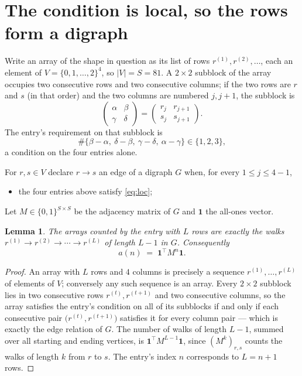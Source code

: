 \documentclass[11pt,a4paper]{article}
\theoremstyle{plain}
\newtheorem{lemma}[theorem]{Lemma}
\theoremstyle{definition}
\begin{document}
\section{The condition is local, so the rows form a digraph}

Write an array of the shape in question as its list of rows
$r^{(1)},r^{(2)},\dots$, each an element of
$V=\{0,1,\dots,2\}^{4}$, so $|V|=S=81$. A $2\times2$ subblock of the array
occupies two consecutive rows and two consecutive columns; if the two rows are $r$
and $s$ (in that order) and the two columns are numbered $j,j+1$,
the subblock is
\[
\begin{pmatrix}\alpha&\beta\\\gamma&\delta\end{pmatrix}=\begin{pmatrix}r_j&r_{j+1}\\s_j&s_{j+1}\end{pmatrix}.
\]
The entry's requirement on that subblock is
\begin{equation}\label{eq:loc}
\#\{\beta-\alpha,\ \delta-\beta,\ \gamma-\delta,\ \alpha-\gamma\}\in\{1,2,3\},
\end{equation}
a condition on the four entries alone.

For $r,s\in V$ declare $r\to s$ an edge of a digraph $G$ when, for every
$1\le j\le 4-1$,
\begin{itemize}
\item the four entries above satisfy \eqref{eq:loc};

\end{itemize}
Let $M\in\{0,1\}^{S\times S}$ be the adjacency matrix of $G$ and $\mathbf{1}$ the
all-ones vector.

\begin{lemma}\label{lem:walk}
The arrays counted by the entry with $L$ rows are exactly the walks
$r^{(1)}\to r^{(2)}\to\cdots\to r^{(L)}$ of length $L-1$ in $G$. Consequently
\[
a(n)\;=\;\mathbf{1}^{\!\top}M^{n}\mathbf{1} .
\]
\end{lemma}

\begin{proof}
An array with $L$ rows and $4$ columns is precisely a sequence
$r^{(1)},\dots,r^{(L)}$ of elements of $V$; conversely any such sequence is an array.
Every $2\times2$ subblock lies in two consecutive rows $r^{(t)},r^{(t+1)}$ and two
consecutive columns, so the array satisfies the entry's condition on all of its subblocks
if and only if each consecutive pair $\bigl(r^{(t)},r^{(t+1)}\bigr)$ satisfies it for
every column pair --- which is exactly the edge relation of $G$. The number of walks of
length $L-1$, summed over all starting and ending vertices, is
$\mathbf{1}^{\!\top}M^{L-1}\mathbf{1}$, since $(M^{k})_{r,s}$ counts the walks of
length $k$ from $r$ to $s$. The entry's index $n$ corresponds to $L=n+1$ rows.
\end{proof}
\end{document}
